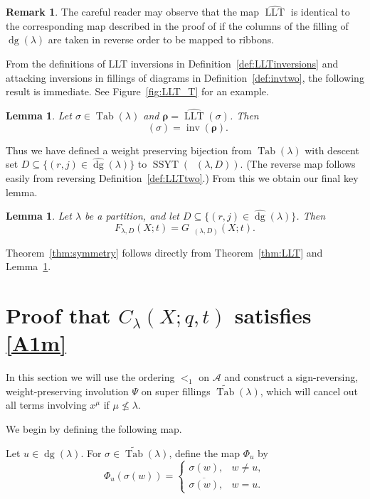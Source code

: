 \documentclass[11pt]{article}
\newtheorem{lemma}[theo]{Lemma}
\theoremstyle{definition}
\newtheorem{remark}[theo]{Remark}
\numberwithin{equation}{section}
\DeclareMathOperator{\PQT}{Tab}
\DeclareMathOperator{\dg}{dg}
\DeclareMathOperator{\inv}{inv}
\DeclareMathOperator{\SSYT}{SSYT}
\DeclareMathOperator{\LLT}{LLT}
\DeclareMathOperator{\boldnu}{\widehat{\boldsymbol{\nu}}}
\DeclareMathOperator{\invtwo}{\widehat{\inv}}
\begin{document}
\begin{remark}
The careful reader may observe that the map $\widehat{\LLT}$ is identical to the corresponding map described in the proof of \cite[Proposition 3.4]{HHL05} if the columns of the filling of $\dg(\lambda)$ are taken in reverse order to be mapped to ribbons.
\end{remark}

From the definitions of LLT inversions in Definition~\ref{def:LLTinversions} and attacking inversions in fillings of diagrams in Definition~\ref{def:invtwo}, the following result is immediate. See Figure~\ref{fig:LLT_T} for an example.

\begin{lemma}\label{lem:LLTtwo}
Let $\sigma\in\PQT(\lambda)$ and $\boldsymbol{\rho}=\widehat{\LLT}(\sigma)$. Then
\[
\invtwo(\sigma) = \inv(\boldsymbol{\rho}).
\]
\end{lemma}


Thus we have defined a weight preserving bijection from $\PQT(\lambda)$ with descent set $D \subseteq \{(r,j) \in \widehat{\dg}(\lambda)\}$ to $\SSYT(\boldnu(\lambda,D))$. (The reverse map follows easily from reversing Definition~\ref{def:LLTtwo}.) From this we obtain our final key lemma.

\begin{lemma}\label{lem:FG}
Let $\lambda$ be a partition, and let $D \subseteq \{(r,j) \in \widehat{\dg}(\lambda)\}$. Then
\[
F_{\lambda,D}(X;t) = G_{\boldnu(\lambda,D)}(X;t).
\]
\end{lemma}

Theorem~\ref{thm:symmetry} follows directly from Theorem~\ref{thm:LLT} and Lemma~\ref{lem:FG}.







\section{Proof that $C_{\lambda}(X;q,t)$ satisfies \eqref{A1m}}
\label{sec:A1m}

In this section we will use the ordering $<_1$ on $\mathcal{A}$ and construct a sign-reversing, weight-preserving involution $\Psi$ on super fillings $\widetilde{\PQT}(\lambda)$, which will cancel out all terms involving $x^{\mu}$ if $\mu \not\leq \lambda$. 

We begin by defining the following map.

\begin{defn}\label{def:Phi_u} 
Let $u\in\dg(\lambda)$. For $\sigma\in\widetilde{\PQT}(\lambda)$, define the map $\Phi_u$ by
\[
\Phi_u(\sigma(w))=\begin{cases} \sigma(w),& w \neq u,\\[0.2cm]
\overline{\sigma(w)},& w=u.
\end{cases}
\]
\end{defn} 
\end{document}
